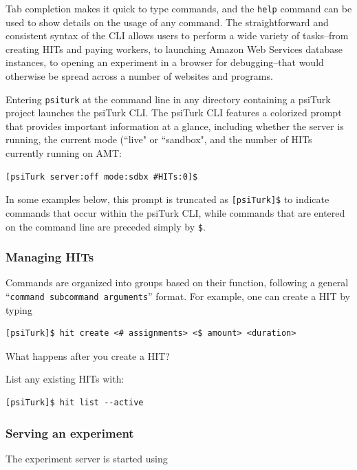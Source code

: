 \documentclass[twocolumn]{svjour3}          %
\begin{document}
Tab completion makes it quick to type commands, and the \texttt{help} command can be used to show
details on the usage of any command. 
The straightforward and consistent syntax of the CLI allows
users to perform a wide variety of tasks--from creating HITs and paying workers, to launching Amazon
Web Services database instances, to opening an experiment in a browser for debugging--that
would otherwise be spread across a number of websites and programs. 

Entering
\texttt{psiturk} at the command line in any directory containing a psiTurk project launches the
psiTurk CLI.
The psiTurk CLI features a colorized prompt that provides important information at a glance, including
whether the server is running, the current mode (``live" or ``sandbox", and the number of HITs currently running on AMT:

\begin{lstlisting}
[psiTurk server:off mode:sdbx #HITs:0]$
\end{lstlisting}

\noindent In some examples below, this prompt is truncated as \texttt{[psiTurk]\$} to indicate commands that occur within the psiTurk CLI, while commands that are entered on the command line are preceded simply by \texttt{\$}.


\subsubsection{Managing HITs}
Commands are organized into groups based on their function, following a general ``\texttt{command subcommand
arguments}'' format. For example, one can create a HIT by typing 

\begin{lstlisting}
[psiTurk]$ hit create <# assignments> <$ amount> <duration>
\end{lstlisting}

What happens after you create a HIT?

List any existing HITs with:

\begin{lstlisting}
[psiTurk]$ hit list --active
\end{lstlisting}


\subsubsection{Serving an experiment}

The experiment server is started using
\end{document}
